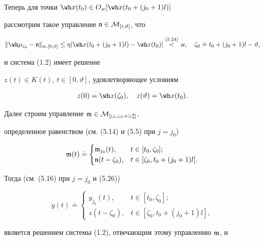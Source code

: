 Теперь для точки $\wh x(t_0)\in O_\varkappa[\wh x(t_0+(j_0+1)l)]$


рассмотрим такое управление $\frak n\in\cal M_{[0,\vartheta ]}$, что


\begin{equation}


\|\wh\mu_{\zeta_0}-\frak n\|_{w,[0,\vartheta]}


\le\eta|\wh x(t_0+(j_0+1)l)-\wh x(t_0)|


\up{(5.24)}{<}\varkappa,\quad \zeta_0\doteq t_0+(j_0+1)l-\vartheta,


\end{equation}


и система (1.2) имеет решение


$z(t)\in K(t)$, $t\in[0,\vartheta]$, удовлетворяющее условиям


\begin{equation}


z(0)=\wh x(\zeta_0),\quad z(\vartheta )=\wh x(t_0).


\end{equation}





Далее строим управление $\frak m\in\cal M_{[t_0,t_0+j_0l]}$,


определенное равенством (см. (5.14) и (5.5) при $j=j_0$)


$$


\frak m(t)\doteq \begin{cases}


\frak m_{j_0}(t),& t\in[t_0,\zeta_0]; \\


\frak n(t-\zeta_0),& t\in[\zeta_0,t_0+(j_0+1)l].


\end{cases}


$$


Тогда (см. (5.16) при $j=j_0$ и (5.26))


$$


y(t)\doteq \begin{cases}


y_{j_0}(t),& t\in[t_0,\zeta_0];\\


z(t-\zeta_0),& t\in[\zeta_0,t_0+(j_0+1)l],


\end{cases}


$$


является решением системы (1.2), отвечающим этому управлению $\frak m$, и


